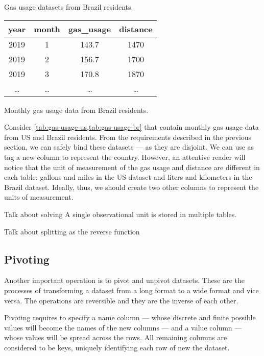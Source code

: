 \begin{tablebox}[label=tab:gas-usage-br]{Gas usage datasets from Brazil residents.}
  \centering
  \begin{tabular}{cccc}
    \toprule
    \textbf{year} & \textbf{month} & \textbf{gas\_usage} & \textbf{distance} \\
    \midrule
    2019 & 1 & 143.7 & 1470 \\
    2019 & 2 & 156.7 & 1700 \\
    2019 & 3 & 170.8 & 1870 \\
    \dots & \dots & \dots & \dots \\
    \bottomrule
  \end{tabular}
  \tcblower
  Monthly gas usage data from Brazil residents.
\end{tablebox}

Consider \cref{tab:gas-usage-us,tab:gas-usage-br} that contain monthly gas usage data from
US and Brazil residents.  From the requirements described in the previous section, we can
safely bind these datasets --- as they are disjoint.  We can use as tag a new column to
represent the country.  However, an attentive reader will notice that the unit of
measurement of the gas usage and distance are different in each table: gallons and miles
in the US dataset and liters and kilometers in the Brazil dataset.  Ideally, thus, we
should create two other columns to represent the units of measurement.

{\color{red} Talk about solving A single observational unit is stored in multiple tables.}

{\color{red} Talk about splitting as the reverse function}

\subsection{Pivoting}

Another important operation is to pivot and unpivot datasets.  These are the processes of
transforming a dataset from a long format to a wide format and vice versa.  The operations
are reversible and they are the inverse of each other.

Pivoting requires to specify a name column --- whose discrete and finite possible values
will become the names of the new columns --- and a value column --- whose values will be
spread across the rows.  All remaining columns are considered to be keys, uniquely
identifying each row of new the dataset.

